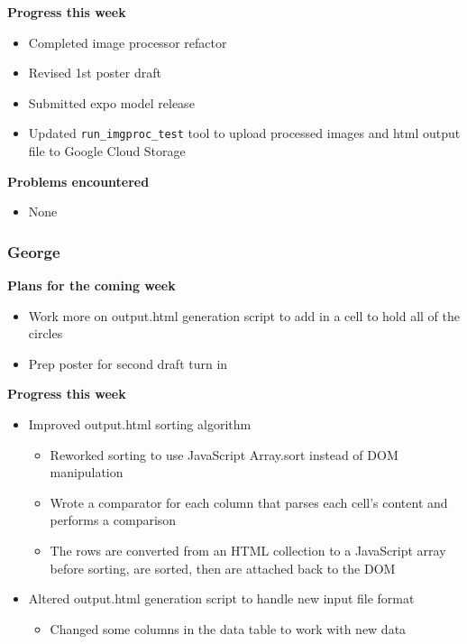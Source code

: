 \documentclass[10pt, onecolumn, draftclsnofoot, letterpaper, compsoc]{IEEEtran}
\begin{document}
    \noindent \textbf{Progress this week}

    \begin{itemize}

    \item Completed image processor refactor
    \item Revised 1st poster draft
    \item Submitted expo model release
    \item Updated \texttt{run\_imgproc\_test} tool to upload processed images and html output file to Google Cloud Storage

    \end{itemize}

    \noindent \textbf{Problems encountered}

    \begin{itemize}

    \item None

    \end{itemize}

    \subsubsection{George}

    \noindent \textbf{Plans for the coming week}

    \begin{itemize}

    \item Work more on output.html generation script to add in a cell to hold all of the circles
    \item Prep poster for second draft turn in

    \end{itemize}

    \noindent \textbf{Progress this week}

    \begin{itemize}

    \item Improved output.html sorting algorithm
    \begin{itemize}
      \item Reworked sorting to use JavaScript Array.sort instead of DOM manipulation
      \item Wrote a comparator for each column that parses each cell's content and performs a comparison
      \item The rows are converted from an HTML collection to a JavaScript array before sorting, are sorted, then are attached back to the DOM
    \end{itemize}

    \item Altered output.html generation script to handle new input file format
    \begin{itemize}
      \item Changed some columns in the data table to work with new data
    \end{itemize}

    \end{itemize}
\end{document}
